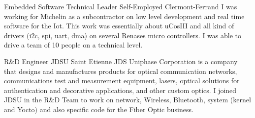 \documentclass[11pt,a4paper,sans]{moderncv}
\begin{document}
{Embedded Software Technical Leader}
{Self-Employed}
{Clermont-Ferrand}
{}
{I was working for Michelin as a subcontractor on low level development
and real time software for the Iot. This work was essentially about uCosIII
and all kind of drivers (i2c, spi, uart, dma) on several Renases micro
controllers. I was able to drive a team of 10 people on a technical level.}

{R\&D Engineer}
{JDSU}
{Saint Etienne}
{}
{JDS Uniphase Corporation is a company that designs and manufactures products
for optical communication networks, communications test and measurement
equipment, lasers, optical solutions for authentication and decorative
applications, and other custom optics.
I joined JDSU in the R\&D Team to work on network, Wireless, Bluetooth,
system (kernel and Yocto) and also specific code for the Fiber Optic
business.}
\end{document}
